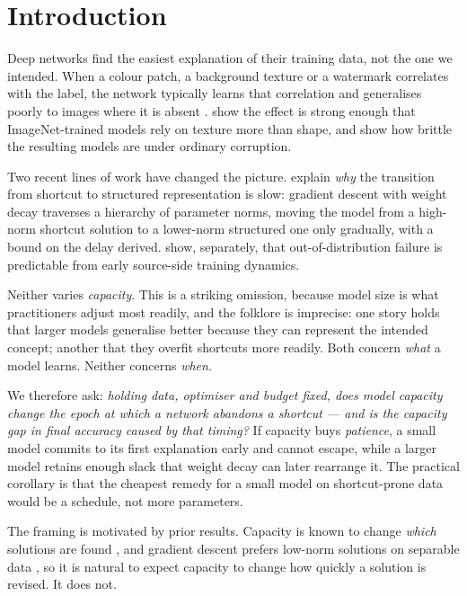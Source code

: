 \documentclass[conference]{IEEEtran}
\begin{document}
\section{Introduction}

Deep networks find the easiest explanation of their training data, not the one we
intended. When a colour patch, a background texture or a watermark correlates with the
label, the network typically learns that correlation and generalises poorly to images
where it is absent \cite{geirhos2020shortcut}. \cite{geirhos2019texture} show the effect is
strong enough that ImageNet-trained models rely on texture more than shape, and
\cite{hendrycks2019corruptions} show how brittle the resulting models are under ordinary
corruption.

Two recent lines of work have changed the picture. \cite{nht2026} explain \emph{why} the
transition from shortcut to structured representation is slow: gradient descent with weight
decay traverses a hierarchy of parameter norms, moving the model from a high-norm shortcut
solution to a lower-norm structured one only gradually, with a bound on the delay derived.
\cite{ood2026} show, separately, that out-of-distribution failure is predictable from early
source-side training dynamics.

Neither varies \emph{capacity}. This is a striking omission, because model size is what
practitioners adjust most readily, and the folklore is imprecise: one story holds that
larger models generalise better because they can represent the intended concept; another
that they overfit shortcuts more readily. Both concern \emph{what} a model learns. Neither
concerns \emph{when}.

We therefore ask: \emph{holding data, optimiser and budget fixed, does model capacity
change the epoch at which a network abandons a shortcut --- and is the capacity gap in
final accuracy caused by that timing?} If capacity buys \emph{patience}, a small model
commits to its first explanation early and cannot escape, while a larger model retains
enough slack that weight decay can later rearrange it. The practical corollary is that the
cheapest remedy for a small model on shortcut-prone data would be a schedule, not more
parameters.

The framing is motivated by prior results. Capacity is known to change \emph{which}
solutions are found \cite{zhang2017rethinking,nakkiran2021double,frankle2020mode}, and
gradient descent prefers low-norm solutions on separable data \cite{soudry2018implicit}, so
it is natural to expect capacity to change how quickly a solution is revised. It does not.
\end{document}
